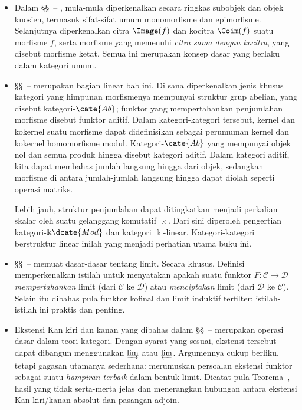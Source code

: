 \begin{itemize}
	\item Dalam \S\S~--%
	, mula-mula diperkenalkan secara ringkas
	subobjek dan objek kuosien, termasuk sifat-sifat umum monomorfisme dan
	epimorfisme. Selanjutnya diperkenalkan citra $\Image(f)$ dan kocitra
	$\Coim(f)$ suatu morfisme $f$, serta morfisme yang memenuhi
	\emph{citra sama dengan kocitra}, yang disebut morfisme ketat. Semua ini
	merupakan konsep dasar yang berlaku dalam kategori umum.

	\item \S\S~--%
	 merupakan bagian linear bab ini.
	Di sana diperkenalkan jenis khusus kategori yang himpunan morfismenya
	mempunyai struktur grup abelian, yang disebut kategori-$\cate{Ab}$;
	funktor yang mempertahankan penjumlahan morfisme disebut funktor aditif.
	Dalam kategori-kategori tersebut, kernel dan kokernel suatu morfisme dapat
	didefinisikan sebagai perumuman kernel dan kokernel homomorfisme modul.
	Kategori-$\cate{Ab}$ yang mempunyai objek nol dan semua produk hingga
	disebut kategori aditif. Dalam kategori aditif, kita dapat membahas jumlah
	langsung hingga dari objek, sedangkan morfisme di antara jumlah-jumlah
	langsung hingga dapat diolah seperti operasi matriks.

	Lebih jauh, struktur penjumlahan dapat ditingkatkan menjadi perkalian
	skalar oleh suatu gelanggang komutatif $\Bbbk$. Dari sini diperoleh
	pengertian kategori-$\Bbbk\dcate{Mod}$ dan kategori $\Bbbk$-linear.
	Kategori-kategori berstruktur linear inilah yang menjadi perhatian utama
	buku ini.

	\item \S\S~--%
	 memuat dasar-dasar tentang
	limit. Secara khusus,
	Definisi~ memperkenalkan istilah
	untuk menyatakan apakah suatu funktor $F: \mathcal{C} \to \mathcal{D}$
	\emph{mempertahankan} limit (dari $\mathcal{C}$ ke $\mathcal{D}$) atau
	\emph{menciptakan} limit (dari $\mathcal{D}$ ke $\mathcal{C}$).
	Selain itu dibahas pula funktor kofinal dan limit induktif terfilter;
	istilah-istilah ini praktis dan penting.

	\item Ekstensi Kan kiri dan kanan yang dibahas dalam
	\S\S~--%
	 merupakan operasi dasar dalam
	teori kategori. Dengan syarat yang sesuai, ekstensi tersebut dapat
	dibangun menggunakan $\varinjlim$ atau $\varprojlim$. Argumennya cukup
	berliku, tetapi gagasan utamanya sederhana: merumuskan persoalan ekstensi
	funktor sebagai suatu \emph{hampiran terbaik} dalam bentuk limit. Dicatat
	pula Teorema~, hasil
	yang tidak serta-merta jelas dan menerangkan hubungan antara ekstensi Kan
	kiri/kanan absolut dan pasangan adjoin.


\end{itemize}
